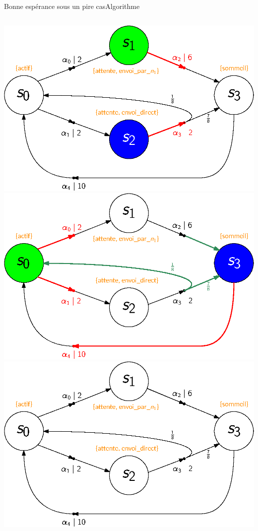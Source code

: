 \documentclass[compress]{beamer}
\theoremstyle{theorem}%
\begin{document}
\begin{frame}{Bonne espérance sous un pire cas}{Algorithme}
\begin{columns}
\begin{column}{0.45\linewidth}
\begin{overprint}
        \includegraphics[width=\linewidth]{resources/unfold2_5}
        \includegraphics[width=\linewidth]{resources/unfold3_5}
        \includegraphics[width=\linewidth]{resources/main-mdp6}

\end{overprint}
\end{column}
\end{columns}
\end{frame}
\end{document}
